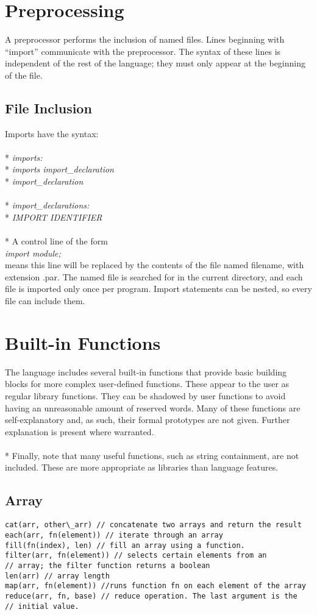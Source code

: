 \section{Preprocessing}
A preprocessor performs the inclusion of named files. Lines beginning with “import” communicate with the preprocessor. The syntax of these lines is independent of the rest of the language; they must only appear at the beginning of the file.

\subsection{File Inclusion}
Imports have the syntax:
\\ \\* \tab \emph{imports:}
\\* \tab \tab \emph{imports import\_declaration}
\\* \tab \tab \emph{import\_declaration}
\\ \\* \tab \emph{import\_declarations:}
\\* \tab \tab \emph{IMPORT IDENTIFIER}
\\ \\* A control line of the form
\\ \tab \emph{import module;}
\\ means this line will be replaced by the contents of the file named filename, with extension .par. The named file is searched for in the current directory, and each file is imported only once per program. Import statements can be nested, so every file can include them.

\section{Built-in Functions}
The language includes several built-in functions that provide basic building blocks for more complex user-defined functions. These appear to the user as regular library functions. They can be shadowed by user functions to avoid having an unreasonable amount of reserved words. Many of these functions are self-explanatory and, as such, their formal prototypes are not given.  Further explanation is present where warranted.
\\ \\* Finally, note that many useful functions, such as string containment, are not included. These are more appropriate as libraries than language features.

\subsection{Array}
\begin{verbatim}
cat(arr, other\_arr) // concatenate two arrays and return the result
each(arr, fn(element)) // iterate through an array
fill(fn(index), len) // fill an array using a function.
filter(arr, fn(element)) // selects certain elements from an 
// array; the filter function returns a boolean
len(arr) // array length
map(arr, fn(element)) //runs function fn on each element of the array
reduce(arr, fn, base) // reduce operation. The last argument is the 
// initial value.
\end{verbatim}


